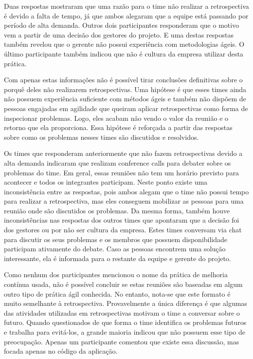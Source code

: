 \documentclass[12pt]{article}
\begin{document}
Duas respostas mostraram que uma razão para o time não realizar a retrospectiva é devido a falta de tempo, já que ambos alegaram que a equipe está passando por período de alta demanda. Outros dois participantes responderam que o motivo vem a partir de uma decisão dos gestores do projeto. E uma destas respostas também revelou que o gerente não possui experiência com metodologias ágeis. O último participante também indicou que não é cultura da empresa utilizar desta prática. 

Com apenas estas informações não é possível tirar conclusões definitivas sobre o porquê deles não realizarem retrospectivas. Uma hipótese é que esses times ainda não possuem experiência suficiente com métodos ágeis e também não dispõem de pessoas engajadas em agilidade que queiram aplicar retrospectivas como forma de inspecionar problemas. Logo, eles acabam não vendo o valor da reunião e o retorno que ela proporciona. Essa hipótese é reforçada a partir das respostas sobre como os problemas nesses times são discutidos e resolvidos.

Os times que responderam anteriormente que não fazem retrospectivas devido a alta demanda indicaram que realizam conference calls para debater sobre os problemas do time. Em geral, essas reuniões não tem um horário previsto para acontecer e todos os integrantes participam. Neste ponto existe uma inconsistência entre as respostas, pois ambos alegam que o time não possui tempo para realizar a retrospectiva, mas eles conseguem mobilizar as pessoas para uma reunião onde são discutidos os problemas. Da mesma forma, também houve inconsistências nas respostas dos outros times que apontaram que a decisão foi dos gestores ou por não ser cultura da empresa. Estes times conversam via chat para discutir os seus problemas e os membros que possuem disponibilidade participam ativamente do debate. Caso as pessoas encontrem uma solução interessante, ela é informada para o restante da equipe e gerente do projeto.

Como nenhum dos participantes mencionou o nome da prática de melhoria contínua usada, não é possível concluir se estas reuniões são baseadas em algum outro tipo de prática ágil conhecida. No entanto, nota-se que este formato é muito semelhante à retrospectiva. Provavelmente a única diferença é que algumas das atividades utilizadas em retrospectivas motivam o time a conversar sobre o futuro. Quando questionados de que forma o time identifica os problemas futuros e trabalha para evitá-los, a grande maioria indicou que não possuem esse tipo de preocupação. Apenas um participante comentou que existe essa discussão, mas focada apenas no código da aplicação.
\end{document}
